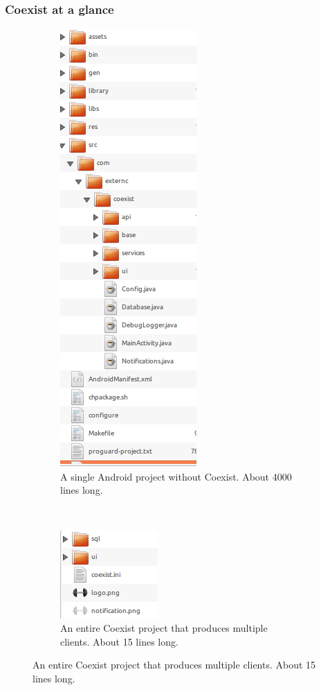 \documentclass[]{beamer}
\begin{document}
\begin{frame}
\frametitle{Coexist at a glance}

\begin{figure}
    \centering
    \begin{subfigure}[b]{0.5\textwidth}
        \centering
        \includegraphics[width=.3\textwidth]{images/old_project.png}
        \caption{A single Android project without Coexist. About 4000 lines
        long.}
        \label{fig:gull}
    \end{subfigure}%
    ~ %
    \begin{subfigure}[b]{0.5\textwidth}
        \centering
        \includegraphics[width=.8\textwidth]{images/new_project.png}
        \caption{An entire Coexist project that produces multiple clients. About
        15 lines long.}
        \label{fig:tiger}
    \end{subfigure}
\end{figure}



\end{frame}
\end{document}
